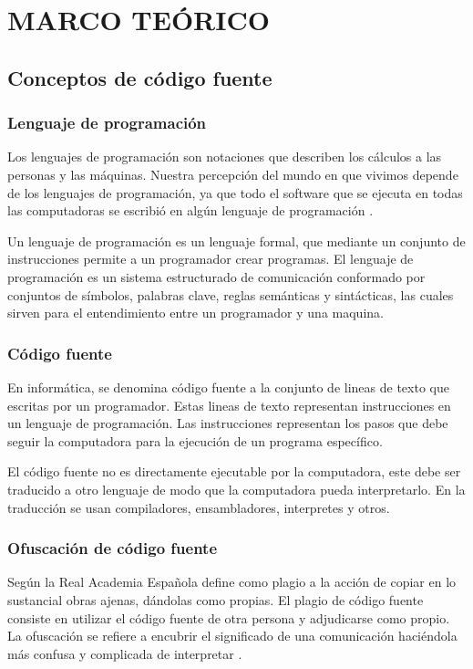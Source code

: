 \chapter{MARCO TEÓRICO}

\section{Conceptos de código fuente}

\subsection{Lenguaje de programación}
Los lenguajes de programación son notaciones que describen los cálculos a las personas y las máquinas. Nuestra percepción del mundo en que vivimos depende de los lenguajes de programación, ya que todo el software que se ejecuta en todas las computadoras se escribió en algún lenguaje de programación \cite{aho2008compiladores}.

Un lenguaje de programación es un lenguaje formal, que mediante un conjunto de instrucciones permite a un programador crear programas. El lenguaje de programación es un sistema estructurado de comunicación conformado por conjuntos de símbolos, palabras clave, reglas semánticas y sintácticas, las cuales sirven para el entendimiento entre un programador y una maquina.

\subsection{Código fuente}
En informática, se denomina código fuente a la conjunto de lineas de texto que escritas por un programador. Estas lineas de texto representan instrucciones en un lenguaje de programación. Las instrucciones representan los pasos que debe seguir la computadora para la ejecución de un programa específico.

El código fuente no es directamente ejecutable por la computadora, este debe ser traducido a otro lenguaje de modo que la computadora pueda interpretarlo. En la traducción se usan compiladores, ensambladores, interpretes y otros.

\subsection{Ofuscación de código fuente}
Según \cite{wiki:Plagiarism} la Real Academia Española define como plagio a la acción de copiar en lo sustancial obras ajenas, dándolas como propias. El plagio de código fuente consiste en utilizar el código fuente de otra persona y adjudicarse como propio.
La ofuscación se refiere a encubrir el significado de una comunicación haciéndola más confusa y complicada de interpretar \cite{wiki:Obfuscation_(software)}.

